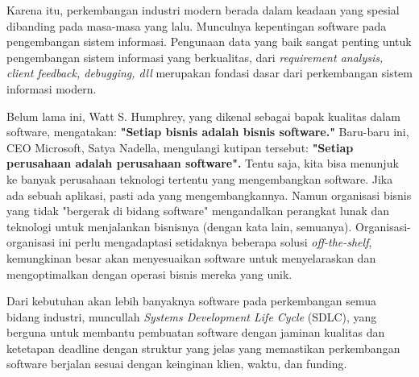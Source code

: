 
Karena itu, perkembangan industri modern berada dalam
keadaan yang spesial dibanding pada masa-masa yang lalu. Munculnya
kepentingan software pada pengembangan
sistem informasi. Pengunaan data yang baik sangat penting untuk pengembangan sistem informasi yang
berkualitas, dari \emph{requirement analysis, client feedback, debugging, dll} merupakan fondasi dasar
dari perkembangan sistem informasi modern.

Belum lama ini, Watt S. Humphrey, yang dikenal sebagai bapak kualitas dalam software, mengatakan:
\textbf{"Setiap bisnis adalah bisnis software."}
Baru-baru ini, CEO Microsoft, Satya Nadella, mengulangi kutipan tersebut: 
\textbf{"Setiap perusahaan adalah perusahaan software".}\cite{BMC}
Tentu saja, kita bisa menunjuk ke banyak perusahaan teknologi tertentu yang mengembangkan software.
Jika ada sebuah aplikasi, pasti ada yang mengembangkannya.
Namun organisasi bisnis yang tidak "bergerak di bidang software" mengandalkan perangkat 
lunak dan teknologi untuk menjalankan bisnisnya (dengan kata lain, semuanya). 
Organisasi-organisasi ini perlu mengadaptasi setidaknya beberapa solusi \emph{off-the-shelf}, 
kemungkinan besar akan menyesuaikan software untuk menyelaraskan dan mengoptimalkan dengan 
operasi bisnis mereka yang unik.

Dari kebutuhan akan lebih banyaknya software pada perkembangan semua bidang industri,
muncullah \emph{Systems Development Life Cycle} (SDLC), yang berguna untuk membantu pembuatan software
dengan jaminan kualitas dan ketetapan deadline dengan struktur yang jelas yang memastikan perkembangan
software berjalan sesuai dengan keinginan klien, waktu, dan funding.